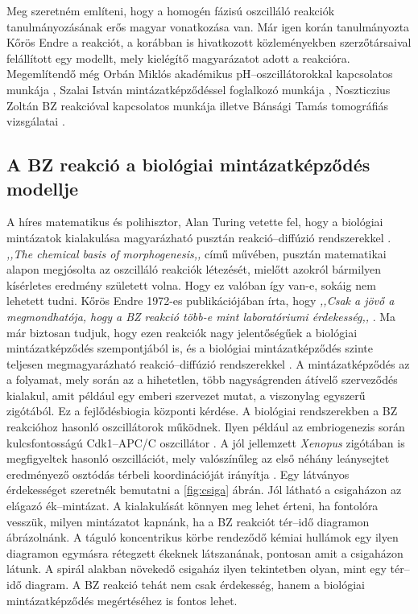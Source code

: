 Meg szeretném említeni, hogy a homogén fázisú oszcilláló reakciók tanulmányozásának erős magyar vonatkozása van. Már igen korán tanulmányozta Kőrös Endre a reakciót, a korábban is hivatkozott közleményekben \cite{field1974oscillations, noyes1972oscillations} szerzőtársaival felállított egy modellt, mely kielégítő magyarázatot adott a reakcióra. Megemlítendő még Orbán Miklós akadémikus pH--oszcillátorokkal kapcsolatos munkája \cite{orban2015ph}, Szalai István mintázatképződéssel foglalkozó munkája \cite{molnar2015pattern}, Noszticzius Zoltán BZ reakcióval kapcsolatos munkája \cite{noszticzius1987sustained} illetve Bánsági Tamás tomográfiás vizsgálatai \cite{bansagi2011tomography}.


\subsection{A BZ reakció a biológiai mintázatképződés modellje}

A híres matematikus és polihisztor, Alan Turing vetette fel, hogy a biológiai mintázatok kialakulása magyarázható pusztán reakció--diffúzió rendszerekkel \cite{turing1952chemical}. \emph{,,The chemical basis of morphogenesis,,} című művében, pusztán matematikai alapon megjósolta az oszcilláló reakciók létezését, mielőtt azokról bármilyen kísérletes eredmény született volna. Hogy ez valóban így van-e, sokáig nem lehetett tudni. Kőrös Endre 1972-es publikációjában írta, hogy \emph{,,Csak a jövő a megmondhatója, hogy a BZ reakció több-e mint laboratóriumi érdekesség,,} \cite{field1972oscillations}. Ma már biztosan tudjuk, hogy ezen reakciók nagy jelentőségűek a biológiai mintázatképződés szempontjából is, és a biológiai mintázatképződés szinte teljesen megmagyarázható reakció--diffúzió rendszerekkel \cite{kondo2010reaction}. A mintázatképződés az a folyamat, mely során az a hihetetlen, több nagyságrenden átívelő szerveződés kialakul, amit például egy emberi szervezet mutat, a viszonylag egyszerű zigótából. Ez a fejlődésbiogia központi kérdése. A biológiai rendszerekben a BZ reakcióhoz hasonló oszcillátorok működnek. Ilyen például az embriogenezis során kulcsfontosságú Cdk1--APC/C oszcillátor \cite{yang2013cdk1}. A jól jellemzett \emph{Xenopus} zigótában is megfigyeltek hasonló oszcillációt, mely valószínűleg az első néhány leánysejtet eredményező osztódás térbeli koordinációját irányítja \cite{chang2013mitotic}. Egy látványos érdekességet szeretnék bemutatni a \ref{fig:csiga} ábrán. Jól látható a csigaházon az elágazó ék--mintázat. A kialakulását könnyen meg lehet érteni, ha fontolóra vesszük, milyen mintázatot kapnánk, ha a BZ reakciót tér--idő diagramon ábrázolnánk. A táguló koncentrikus körbe rendeződő kémiai hullámok egy ilyen diagramon egymásra rétegzett ékeknek látszanának, pontosan amit a csigaházon látunk. A spirál alakban növekedő csigaház ilyen tekintetben olyan, mint egy tér--idő diagram. A BZ reakció tehát nem csak érdekesség, hanem a biológiai mintázatképződés megértéséhez is fontos lehet.

